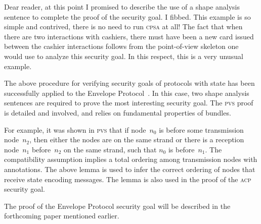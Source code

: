 \documentclass[titlepage,12pt]{article}
\newcommand{\cpsa}{\textsc{cpsa}}
\newcommand{\pvs}{\textsc{pvs}}
\newcommand{\acp}{\textsc{acp}}
\begin{document}
Dear reader, at this point I promised to describe the use of a shape
analysis sentence to complete the proof of the security goal.  I
fibbed.  This example is so simple and contrived, there is no need to
run {\cpsa} at all!  The fact that when there are two interactions
with cashiers, there must have been a new card issued between the
cashier interactions follows from the point-of-view skeleton one would
use to analyze this security goal.  In this respect, this is a very
unusual example.

The above procedure for verifying security goals of protocols with
state has been successfully applied to the Envelope
Protocol~\cite{ables2010escrowed}.  In this case, two shape analysis
sentences are required to prove the most interesting security goal.
The {\pvs} proof is detailed and involved, and relies on fundamental
properties of bundles.

For example, it was shown in {\pvs} that if node~$n_0$ is before some
transmission node~$n_2$, then either the nodes are on the same strand
or there is a reception node~$n_1$ before~$n_2$ on the same strand,
such that $n_0$ is before~$n_1$.  The compatibility assumption implies
a total ordering among transmission nodes with annotations.  The above
lemma is used to infer the correct ordering of nodes that receive
state encoding messages.  The lemma is also used in the proof of the
{\acp} security goal.

The proof of the Envelope Protocol security goal will be described in
the forthcoming paper mentioned earlier.

\printindex
\end{document}
